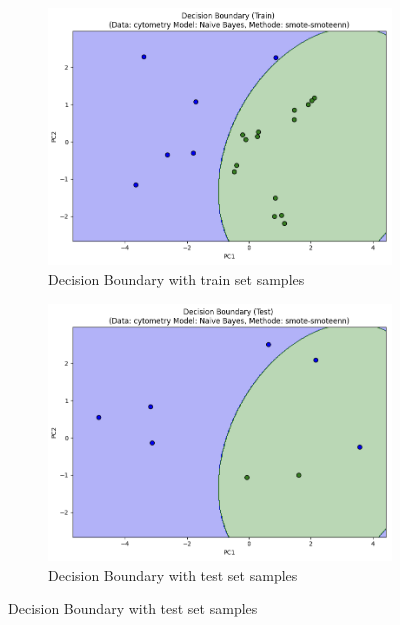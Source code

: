 \documentclass[12pt,a4paper]{report}
\begin{document}
\begin{figure}[h!]
    \begin{subfigure}[b]{0.48\textwidth}
        \centering
        \includegraphics[width=\textwidth]{images/smote_een_fig2c.png}
        \caption{Decision Boundary with train set samples}
        \label{fig:smote_enn_fig2c}
    \end{subfigure}
    \hfill
    \begin{subfigure}[b]{0.48\textwidth}
        \centering
        \includegraphics[width=\textwidth]{images/smote_een_fig2d.png}
        \caption{Decision Boundary with test set samples} 
        \label{fig:smote_enn_fig2d}
    \end{subfigure}


\end{figure}
\end{document}
